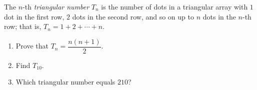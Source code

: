 The $n$-th \emph{triangular number} $T_n$ is the number of dots in a triangular array with $1$ dot in the first row, $2$ dots in the second row, and so on up to $n$ dots in the $n$-th row; that is, $T_n=1+2+\cdots+n$.
\begin{enumerate}
\item[(a)] Prove that $T_n=\dfrac{n(n+1)}{2}$.
\item[(b)] Find $T_{10}$.
\item[(c)] Which triangular number equals $210$?
\end{enumerate}
